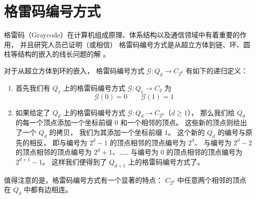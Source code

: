 \section{格雷码编号方式}
\label{Section 2.3}

格雷码（Graycode）在计算机组成原理、体系结构以及通信领域中有着重要的作用，
并且研究人员已证明（或相信）
格雷码编号方式是从超立方体到链、环、圆柱等结构的嵌入的线长问题的解
\cite{Harper.1964,Guu.1997,Manuel.2011}。

对于从超立方体到环的嵌入，
格雷码编号方式 $\mathcal{G} \colon Q_d \rightarrow C_{2^d}$ 有如下的递归定义：
\begin{enumerate}[(1)]
	\item 首先我们有 $Q_1$ 上的格雷码编号方式
		$\mathcal{G} \colon Q_1 \rightarrow C_2$ 为
		\begin{equation*}
		\mathcal{G}(0) = 0 \qquad \mathcal{G}(1) = 1
		\end{equation*}
	\item 如果给定了 $Q_d$ 上的格雷码编号方式
		$\mathcal{G} \colon Q_d \rightarrow C_{2^d}$（$d \ge 1$），
		那么我们给 $Q_d$ 的每一个顶点添加一个坐标前缀 $0$ 和一个相邻的顶点。
		这些新的顶点则给出了一个 $Q_d$ 的拷贝，
		我们为其添加一个坐标前缀 $1$。
		这个新的 $Q_d$ 的编号与原先的相反，
		即与编号为 $2^d - 1$ 的顶点相邻的顶点编号为 $2^d$、
		与编号为 $2^d - 2$ 的顶点相邻的顶点编号为 $2^d + 1$、……
		与编号为 $0$ 的顶点相邻的顶点编号为 $2^{d + 1} - 1$。
		这样我们便得到了 $Q_{d + 1}$ 上的格雷码编号方式了。
\end{enumerate}
值得注意的是，格雷码编号方式有一个显著的特点：
$C_{2^d}$ 中任意两个相邻的顶点在 $Q_d$ 中都有边相连。

